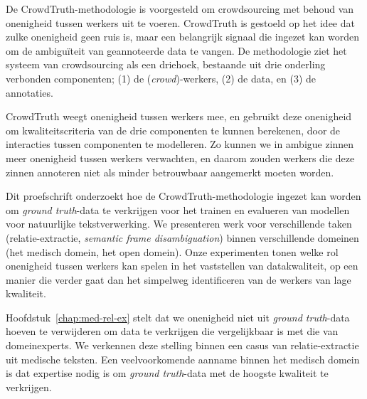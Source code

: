 De CrowdTruth-methodologie is voorgesteld om crowdsourcing met behoud van onenigheid tussen werkers uit te voeren. 
CrowdTruth is gestoeld op het idee dat zulke onenigheid geen ruis is, maar een belangrijk signaal die ingezet kan worden om de ambiguïteit van geannoteerde data te vangen. 
De methodologie ziet het systeem van crowdsourcing als een driehoek, bestaande uit drie onderling verbonden componenten; 
(1) de (\emph{crowd})-werkers, 
(2) de data, en 
(3) de annotaties. 

CrowdTruth weegt onenigheid tussen werkers mee, en gebruikt deze onenigheid om kwaliteitscriteria van de drie componenten te kunnen berekenen, door de interacties tussen componenten te modelleren. 
Zo kunnen we in ambigue zinnen meer onenigheid tussen werkers verwachten, en daarom zouden werkers die deze zinnen annoteren niet als minder betrouwbaar aangemerkt moeten worden. 

Dit proefschrift onderzoekt hoe de CrowdTruth-methodologie ingezet kan worden om \emph{ground truth}-data te verkrijgen voor het trainen en evalueren van modellen voor natuurlijke tekstverwerking. 
We presenteren werk voor verschillende taken (relatie-extractie, \emph{semantic frame disambiguation}) binnen verschillende domeinen (het medisch domein, het open domein). 
Onze experimenten tonen welke rol onenigheid tussen werkers kan spelen in het vaststellen van datakwaliteit, op een manier die verder gaat dan het simpelweg identificeren van de werkers van lage kwaliteit. 

Hoofdstuk~\ref{chap:med-rel-ex} stelt dat we onenigheid niet uit \emph{ground truth}-data hoeven te verwijderen om data te verkrijgen die vergelijkbaar is met die van domeinexperts. 
We verkennen deze stelling binnen een casus van relatie-extractie uit medische teksten. 
Een veelvoorkomende aanname binnen het medisch domein is dat expertise nodig is om \emph{ground truth}-data met de hoogste kwaliteit te verkrijgen. 

